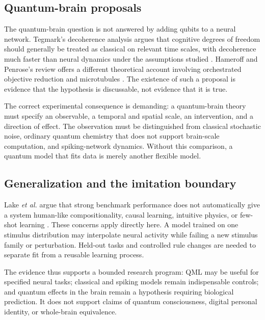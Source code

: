 \documentclass[conference]{IEEEtran}
\begin{document}
\subsection{Quantum-brain proposals}

The quantum-brain question is not answered by adding qubits to a neural network.
Tegmark's decoherence analysis argues that cognitive degrees of freedom should generally
be treated as classical on relevant time scales, with decoherence much faster than neural
dynamics under the assumptions studied \cite{tegmark2000}. Hameroff and Penrose's review
offers a different theoretical account involving orchestrated objective reduction and
microtubules \cite{hameroff2014}. The existence of such a proposal is evidence that the
hypothesis is discussable, not evidence that it is true.

The correct experimental consequence is demanding: a quantum-brain theory must specify
an observable, a temporal and spatial scale, an intervention, and a direction of effect.
The observation must be distinguished from classical stochastic noise, ordinary quantum
chemistry that does not support brain-scale computation, and spiking-network dynamics.
Without this comparison, a quantum model that fits data is merely another flexible model.

\subsection{Generalization and the imitation boundary}

Lake \emph{et al.} argue that strong benchmark performance does not automatically give a
system human-like compositionality, causal learning, intuitive physics, or few-shot
learning \cite{lake2017}. These concerns apply directly here. A model trained on one
stimulus distribution may interpolate neural activity while failing a new stimulus
family or perturbation. Held-out tasks and controlled rule changes are needed to
separate fit from a reusable learning process.

The evidence thus supports a bounded research program: QML may be useful for specified
neural tasks; classical and spiking models remain indispensable controls; and quantum
effects in the brain remain a hypothesis requiring biological prediction. It does not
support claims of quantum consciousness, digital personal identity, or whole-brain
equivalence.
\end{document}
